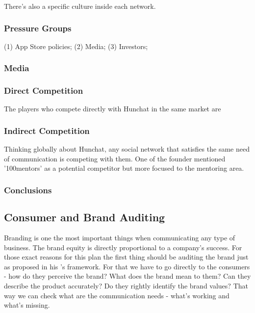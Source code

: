 \documentclass[12pt]{article}
\begin{document}
	 
	 	 
	 There's also a specific culture inside each network.
	 
	 


	\subsubsection{Pressure Groups}
	(1) App Store policies; (2) Media; (3) Investors; 
	
	\subsubsection{Media}
	
	\subsubsection{Direct Competition}
	The players who compete directly with Hunchat in the same market are
	
	\subsubsection{Indirect Competition}
	Thinking globally about Hunchat, any social network that satisfies the same need of communication is competing with them. One of the founder mentioned '100mentors' as a potential competitor but more focused to the mentoring area.
	
	\subsubsection{Conclusions}
	

	
\subsection{Consumer and Brand Auditing}
Branding is one the most important things when communicating any type of business. The brand equity is directly proportional to a company's success. For those exact reasons for this plan the first thing should be auditing the brand just as \citeauthor{kliatchko} proposed in his \citeyear{kliatchko}'s framework. For that we have to go directly to the consumers - how do they perceive the brand? What does the brand mean to them? Can they describe the product accurately? Do they rightly identify the brand values? That way we can check what are the communication needs - what's working and what's missing.
\end{document}
